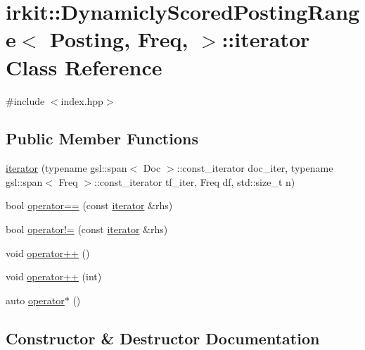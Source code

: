 \hypertarget{classirkit_1_1DynamiclyScoredPostingRange_1_1iterator}{}\section{irkit\+:\+:Dynamicly\+Scored\+Posting\+Range$<$ Posting, Freq, $>$\+:\+:iterator Class Reference}
\label{classirkit_1_1DynamiclyScoredPostingRange_1_1iterator}


{\ttfamily \#include $<$index.\+hpp$>$}

\subsection*{Public Member Functions}
\begin{DoxyCompactItemize}
\item 
\hyperlink{classirkit_1_1DynamiclyScoredPostingRange_1_1iterator_a509a7b242a5340bf055655f3f4be3fdf}{iterator} (typename gsl\+::span$<$ Doc $>$\+::const\+\_\+iterator doc\+\_\+iter, typename gsl\+::span$<$ Freq $>$\+::const\+\_\+iterator tf\+\_\+iter, Freq df, std\+::size\+\_\+t n)
\item 
bool \hyperlink{classirkit_1_1DynamiclyScoredPostingRange_1_1iterator_a9dd3bf6576356e15bbd846e4f3590c8b}{operator==} (const \hyperlink{classirkit_1_1DynamiclyScoredPostingRange_1_1iterator}{iterator} \&rhs)
\item 
bool \hyperlink{classirkit_1_1DynamiclyScoredPostingRange_1_1iterator_afe8fa01fe3f45c67c02824462ba4d657}{operator!=} (const \hyperlink{classirkit_1_1DynamiclyScoredPostingRange_1_1iterator}{iterator} \&rhs)
\item 
void \hyperlink{classirkit_1_1DynamiclyScoredPostingRange_1_1iterator_a4847e67173c4b0df0b432021a40ae904}{operator++} ()
\item 
void \hyperlink{classirkit_1_1DynamiclyScoredPostingRange_1_1iterator_a258d9907607cddfb69c41087efb67fab}{operator++} (int)
\item 
auto \hyperlink{classirkit_1_1DynamiclyScoredPostingRange_1_1iterator_a84e9883c3c3f2bef9aab7d319175376f}{operator$\ast$} ()
\end{DoxyCompactItemize}


\subsection{Constructor \& Destructor Documentation}
\mbox{\label{classirkit_1_1DynamiclyScoredPostingRange_1_1iterator_a509a7b242a5340bf055655f3f4be3fdf}} 
